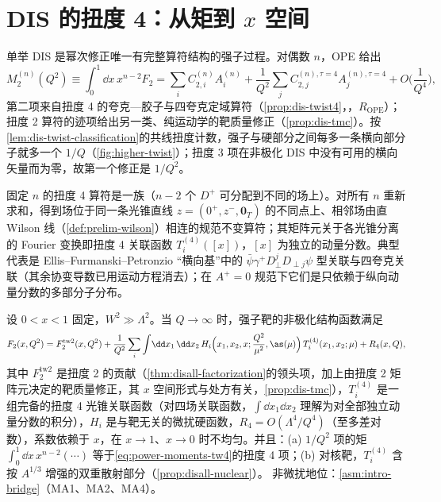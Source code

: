 \section{DIS 的扭度 4：从矩到 \texorpdfstring{$x$}{x} 空间}\label{sec:power-twist4}

单举 DIS 是幂次修正唯一有完整算符结构的强子过程。对偶数 $n$，OPE 给出
\begin{equation}\label{eq:power-moments-tw4}
M_2^{(n)}(Q^2)\equiv\int_0^1\!\dd x\,x^{n-2}F_2
=\sum_iC^{(n)}_{2,i}A^{(n)}_i+\frac1{Q^2}\sum_jC^{(n),\tau=4}_{2,j}A^{(n),\tau=4}_j+O\Big(\frac{1}{Q^4}\Big),
\end{equation}
第二项来自扭度 4 的夸克—胶子与四夸克定域算符（\cref{prop:dis-twist4}，\tagR，$R_{\mathrm{OPE}}$）；扭度 2 算符的迹项给出另一类、纯运动学的靶质量修正（\cref{prop:dis-tmc}）。按\cref{lem:dis-twist-classification}的共线扭度计数，强子与硬部分之间每多一条横向部分子就多一个 $1/Q$（\cref{fig:higher-twist}）；扭度 3 项在非极化 DIS 中没有可用的横向矢量而为零，故第一个修正是 $1/Q^2$。

固定 $n$ 的扭度 4 算符是一族（$n-2$ 个 $D^+$ 可分配到不同的场上）。对所有 $n$ 重新求和，得到场位于同一条光锥直线 $z=(0^+,z^-,\mathbf0_T)$ 的不同点上、相邻场由直 Wilson 线（\cref{def:prelim-wilson}）相连的规范不变算符；其矩阵元关于各光锥分离的 Fourier 变换即扭度 4 关联函数 $T^{(4)}_i([x])$，$[x]$ 为独立的动量分数。典型代表是 Ellis--Furmanski--Petronzio “横向基”中的 $\bar\psi\gamma^+D_\perp^jD_{\perp j}\psi$ 型关联与四夸克关联（其余协变导数已用运动方程消去）\cite{EllisFurmanskiPetronzio1982,EllisFurmanskiPetronzio1983}；在 $A^+=0$ 规范下它们是只依赖于纵向动量分数的多部分子分布\cite{Jaffe1983}。

\begin{proposition}\label{prop:power-dis-twist4-x}
设 $0<x<1$ 固定，$W^2\gg\Lambda^2$。当 $Q\to\infty$ 时，强子靶的非极化结构函数满足
\begin{equation}\label{eq:power-twist4-x}
F_2(x,Q^2)=F_2^{\mathrm{tw2}}(x,Q^2)+\frac{1}{Q^2}\sum_i\int\!\dd x_1\,\dd x_2\,H_i\Big(x_1,x_2,x;\frac{Q^2}{\mu^2},\as(\mu)\Big)\,T^{(4)}_i(x_1,x_2;\mu)+R_4(x,Q),
\end{equation}
其中 $F_2^{\mathrm{tw2}}$ 是扭度 2 的贡献（\cref{thm:disall-factorization}的领头项，加上由扭度 2 矩阵元决定的靶质量修正，其 $x$ 空间形式与处方有关，\cref{prop:dis-tmc}），$T^{(4)}_i$ 是一组完备的扭度 4 光锥关联函数（对四场关联函数，$\int\dd x_1\dd x_2$ 理解为对全部独立动量分数的积分），$H_i$ 是与靶无关的微扰硬函数，$R_4=O(\Lambda^4/Q^4)$（至多差对数），系数依赖于 $x$，在 $x\to1$、$x\to0$ 时不均匀。并且：(a) $1/Q^2$ 项的矩 $\int_0^1\dd x\,x^{n-2}(\cdots)$ 等于\eqref{eq:power-moments-tw4}的扭度 4 项；(b) 对核靶，$T^{(4)}_i$ 含按 $A^{1/3}$ 增强的双重散射部分（\cref{prop:disall-nuclear}）。
非微扰地位：\cref{asm:intro-bridge}（MA1、MA2、MA4）。
\end{proposition}


